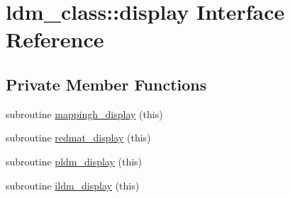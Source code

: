 \hypertarget{interfaceldm__class_1_1display}{\section{ldm\+\_\+class\+:\+:display Interface Reference}
\label{interfaceldm__class_1_1display}
}
\subsection*{Private Member Functions}
\begin{DoxyCompactItemize}
\item 
subroutine \hyperlink{interfaceldm__class_1_1display_af62a75ac19c5fc805d39d75ac4f31d6b}{mappingh\+\_\+display} (this)
\item 
subroutine \hyperlink{interfaceldm__class_1_1display_a1f024fcc4831badc0c00e00a1b81a5eb}{redmat\+\_\+display} (this)
\item 
subroutine \hyperlink{interfaceldm__class_1_1display_a29379c7e12fc2bbaa6c98bb2fd3535f5}{pldm\+\_\+display} (this)
\item 
subroutine \hyperlink{interfaceldm__class_1_1display_a4be0389c3d8fea345a4b839bdc168e75}{ildm\+\_\+display} (this)
\end{DoxyCompactItemize}


